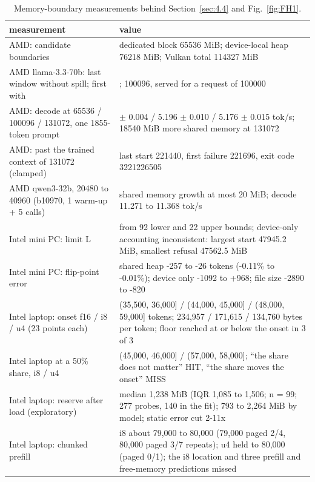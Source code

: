 \documentclass[conference,10pt]{IEEEtran}
\begin{document}
\begin{table}[t]
\caption{Memory-boundary measurements behind Section~\ref{sec:4.4} and Fig.~\ref{fig:FH1}.}
\label{tab:memory}
\centering\footnotesize
\begin{tabular}{@{}>{\raggedright\arraybackslash}p{}>{\raggedright\arraybackslash}p{}@{}}
\toprule
measurement & value \\
\midrule
AMD: candidate boundaries & dedicated block 65536 MiB; device-local heap 76218 MiB; Vulkan total 114327 MiB  \\
AMD llama-3.3-70b: last window without spill; first with & 65536; 100096, served for a request of 100000  \\
AMD: decode at 65536 / 100096 / 131072, one 1855-token prompt & 5.284 $\pm$ 0.004 / 5.196 $\pm$ 0.010 / 5.176 $\pm$ 0.015 tok/s; 18540 MiB more shared memory at 131072  \\
AMD: past the trained context of 131072 (clamped) & last start 221440, first failure 221696, exit code 3221226505  \\
AMD qwen3-32b, 20480 to 40960 (b10970, 1 warm-up + 5 calls) & shared memory growth at most 20 MiB; decode 11.271 to 11.368 tok/s  \\
Intel mini PC: limit L & from 92 lower and 22 upper bounds; device-only accounting inconsistent: largest start 47945.2 MiB, smallest refusal 47562.5 MiB  \\
Intel mini PC: flip-point error & shared heap -257 to -26 tokens (-0.11\% to -0.01\%); device only -1092 to +968; file size -2890 to -820  \\
Intel laptop: onset f16 / i8 / u4 (23 points each) & (35,500, 36,000] / (44,000, 45,000] / (48,000, 59,000] tokens; 234,957 / 171,615 / 134,760 bytes per token; floor reached at or below the onset in 3 of 3  \\
Intel laptop at a 50\% share, i8 / u4 & (45,000, 46,000] / (57,000, 58,000]; ``the share does not matter'' HIT, ``the share moves the onset'' MISS  \\
Intel laptop: reserve after load (exploratory) & median 1,238 MiB (IQR 1,085 to 1,506; n = 99; 277 probes, 140 in the fit); 793 to 2,264 MiB by model; static error cut 2-11x  \\
Intel laptop: chunked prefill & i8 about 79,000 to 80,000 (79,000 paged 2/4, 80,000 paged 3/7 repeats); u4 held to 80,000 (paged 0/1); the i8 location and three prefill and free-memory predictions missed  \\
\bottomrule
\end{tabular}
\end{table}
\end{document}
